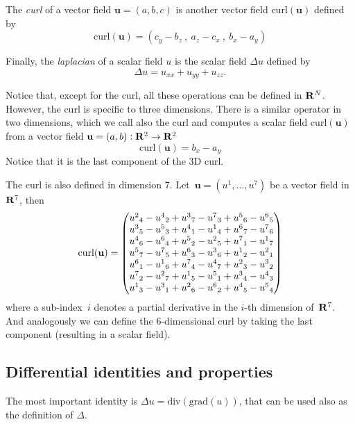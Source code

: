 The \emph{curl} of a vector field $\mathbf{u}=(a,b,c)$ is another vector
field $\mathrm{curl}(\mathbf{u})$ defined by
\[
\mathrm{curl}(\mathbf{u}) =
\left(
c_y - b_z\ ,\ a_z - c_x\ ,\ b_x - a_y
\right)
\]



Finally, the \emph{laplacian} of a scalar field $u$ is the scalar field
$\Delta u$ defined by
\[
\Delta u = u_{xx} + u_{yy} + u_{zz}.
\]




Notice that, except for the curl, all these operations can be defined in
$\mathbf{R}^N$.  However, the curl is specific to three dimensions.  There is a
similar operator in two dimensions, which we call also the curl and computes
a scalar field $\mathrm{curl}(\mathbf{u})$ from a vector field
$\mathbf{u}=(a,b):\mathbf{R}^2\to\mathbf{R}^2$
\[
\mathrm{curl}(\mathbf{u}) = b_x - a_y
\]
Notice that it is the last component of the 3D curl.


The curl is also defined in dimension 7.
Let~$\mathbf{u}=(u^1,\ldots,u^7)$ be a vector field in~$\mathbf{R}^7$, then
\[
\def\curlco#1#2#3#4#5#6{%
{u^{#1}}_{#2}-{u^{#2}}_{#1}+
{u^{#3}}_{#4}-{u^{#4}}_{#3}+
{u^{#5}}_{#6}-{u^{#6}}_{#5}%
}
\mathrm{curl}(\mathbf{u}) =
\left(
	\begin{matrix}
		\curlco{2}{4}{3}{7}{5}{6} \\
		\curlco{3}{5}{4}{1}{6}{7} \\
		\curlco{4}{6}{5}{2}{7}{1} \\
		\curlco{5}{7}{6}{3}{1}{2} \\
		\curlco{6}{1}{7}{4}{2}{3} \\
		\curlco{7}{2}{1}{5}{3}{4} \\
		\curlco{1}{3}{2}{6}{4}{5} \\
	\end{matrix}
\right)
\]
where a sub-index~$i$ denotes a partial derivative in the $i$-th dimension
of~$\mathbf{R}^7$.  And analogously we can define the 6-dimensional curl by taking the last component (resulting in a scalar field).


\subsection{Differential identities and properties}


The most important identity is $\Delta u = \mathrm{div}(\mathrm{grad}(u))$,
that can be used also as the definition of $\Delta$.



